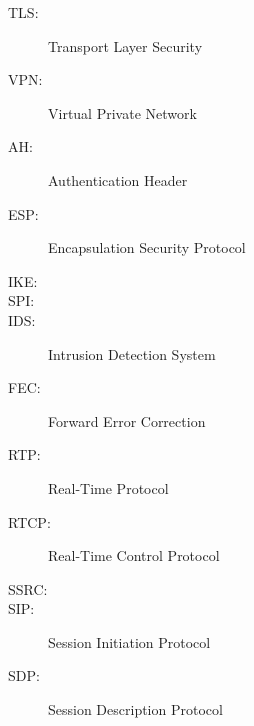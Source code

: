 \begin{description}
	\item[TLS:] Transport Layer Security
	\item[VPN:] Virtual Private Network
	\item[AH:] Authentication Header
	\item[ESP:] Encapsulation Security Protocol
	\item[IKE:]
	\item[SPI:]
	\item[IDS:] Intrusion Detection System
	\item[FEC:] Forward Error Correction
	\item[RTP:] Real-Time Protocol
	\item[RTCP:] Real-Time Control Protocol
	\item[SSRC:]
	\item[SIP:] Session Initiation Protocol
	\item[SDP:] Session Description Protocol
\end{description}
